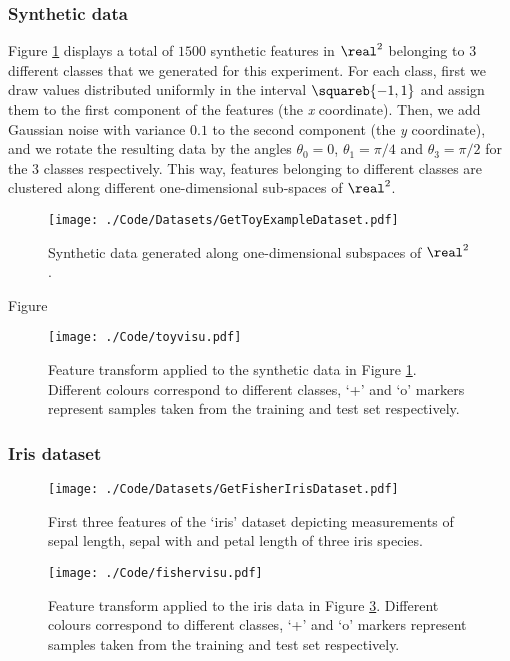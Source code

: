 \documentclass{article}
\begin{document}
\subsubsection{Synthetic data}
Figure \ref{fig:toy} displays a total of $1500$ synthetic features in $\real^{2}$ belonging to $3$ different classes that we generated for this experiment. For each class, first we draw values distributed uniformly in the interval $\squareb{-1,1}$ and assign them to the first component of the features (the \emph{x} coordinate). Then, we add Gaussian noise with variance $0.1$ to the second component (the \emph{y} coordinate), and we rotate the resulting data by the angles $\theta_{0}=0$, $\theta_{1}=\pi/4$ and $\theta_{3}=\pi/2$ for the $3$ classes respectively. This way, features belonging to different classes are clustered along different one-dimensional sub-spaces of $\real^{2}$.
\begin{figure}
\texttt{[image: ./Code/Datasets/GetToyExampleDataset.pdf]}
\caption{\label{fig:toy}Synthetic data generated along one-dimensional subspaces of $\real^{2}$.}
\end{figure}

Figure
\begin{figure}
\texttt{[image: ./Code/toyvisu.pdf]}
\caption{\label{fig:toyNewFea}Feature transform applied to the synthetic data in Figure \ref{fig:toy}. Different colours correspond to different classes, `+' and `o' markers represent samples taken from the training and test set respectively.}
\end{figure}
\subsubsection{Iris dataset}
\begin{figure}
\texttt{[image: ./Code/Datasets/GetFisherIrisDataset.pdf]}
\caption{\label{fig:fisher3} First three features of the `iris' dataset depicting measurements of sepal length, sepal with and petal length of three iris species.}
\end{figure}
\begin{figure}
\texttt{[image: ./Code/fishervisu.pdf]}
\caption{\label{fig:toyNewFea}Feature transform applied to the iris data in Figure \ref{fig:fisher3}. Different colours correspond to different classes, `+' and `o' markers represent samples taken from the training and test set respectively.}
\end{figure}
\end{document}
